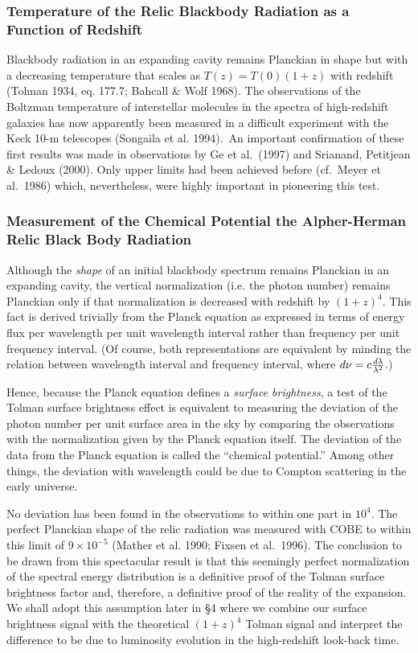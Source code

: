 \documentclass[preprint]{aastex}
\begin{document}
\subsubsection{Temperature of the Relic Blackbody Radiation as a 
Function of Redshift}

Blackbody radiation in an expanding cavity remains Planckian in shape
but with a decreasing temperature that scales as $T(z) = T(0)(1+z)$
with redshift (Tolman 1934, eq. 177.7; Bahcall \& Wolf 1968). The
observations of the Boltzman temperature of interstellar molecules in
the spectra of high-redshift galaxies has now apparently been measured
in a difficult experiment with the Keck 10-m telescopes (Songaila et
al. 1994).\ An important confirmation of these first results was made
in observations by Ge et al.\ (1997) and Srianand, Petitjean \& Ledoux
(2000). Only upper limits had been achieved before (cf.\ Meyer et al.\
1986) which, nevertheless, were highly important in pioneering this
test.

\subsubsection{Measurement of the Chemical Potential the Alpher-Herman 
Relic Black Body Radiation}
     
Although the {\it shape} of an initial blackbody spectrum remains
Planckian in an expanding cavity, the vertical normalization (i.e.
the photon number) remains Planckian only if that normalization is
decreased with redshift by $(1+z)^4$. This fact is derived trivially
from the Planck equation as expressed in terms of energy flux per
wavelength per unit wavelength interval rather than frequency per unit
frequency interval. (Of course, both representations are equivalent by
minding the relation between wavelength interval and frequency
interval, where $d \nu = c {{d\lambda}\over {\lambda^2}}$.)

Hence, because the Planck equation defines a {\it surface brightness},
a test of the Tolman surface brightness effect is equivalent to
measuring the deviation of the photon number per unit surface area in
the sky by comparing the observations with the normalization given by
the Planck equation itself. The deviation of the data from the Planck
equation is called the ``chemical potential.'' Among other things, the
deviation with wavelength could be due to Compton scattering in the
early universe.

No deviation has been found in the observations to within one part in
$10^4$. The perfect Planckian shape of the relic radiation was
measured with COBE to within this limit of $9 \times 10^{-5}$ (Mather
et al. 1990; Fixsen et al.\ 1996). The conclusion to be drawn from
this spectacular result is that this seemingly perfect normalization
of the spectral energy distribution is a definitive proof of the
Tolman surface brightness factor and, therefore, a definitive proof of
the reality of the expansion. We shall adopt this assumption later in
\S 4 where we combine our surface brightness signal with the
theoretical $(1 + z)^4$ Tolman signal and interpret the difference to
be due to luminosity evolution in the high-redshift look-back time.
\end{document}
